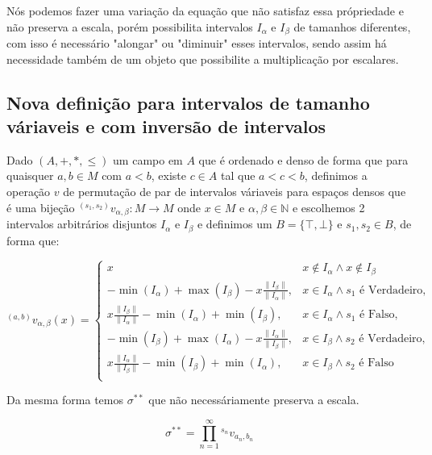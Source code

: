 \documentclass[12pt,a4paper]{article}
\begin{document}
Nós podemos fazer uma variação da equação que não satisfaz essa própriedade e não preserva a escala, porém possibilita
 intervalos $I_{\alpha}$ e $I_{\beta}$ de tamanhos diferentes, com isso é necessário "alongar" ou "diminuir" esses intervalos, 
 sendo assim há necessidade também de um objeto que possibilite a multiplicação por escalares.

 \subsection{Nova definição para intervalos de tamanho váriaveis e com inversão de intervalos}

 Dado $(A, +, *, \leq)$ um campo em $A$ que é ordenado e denso de forma que para quaisquer
  $a,b \in M$ com $a<b$, existe $c \in A$ tal que $a < c < b$, definimos a operação
   $v$ de permutação de par de intervalos váriaveis para espaços densos que é uma 
   bijeção ${}^{(s_1,s_2)}v_{\alpha,\beta}: M \to M$ onde 
   $x \in M$ e $\alpha,\beta \in \mathbb{N}$ e escolhemos 2 intervalos arbitrários 
   disjuntos $I_{\alpha}$ e $I_{\beta}$ e definimos um $B=\{\top, \bot\}$ e 
   $s_1,s_2 \in B$, de forma que:

 \begin{equation}
   {}^{(a,b)}v_{\alpha,\beta}{(x)} = \begin{cases} 
      x & x \not\in I_{\alpha} \land x \not \in I_{\beta}\\
      - \min(I_{\alpha}) + \max(I_{\beta}) - x\frac{\|I_{\beta}\|}{\|I_{\alpha}\|}, & x \in I_{\alpha} \land s_1 \text{ é Verdadeiro},\\
      x\frac{\|I_{\beta}\|}{\|I_{\alpha}\|} - \min(I_{\alpha}) + \min(I_{\beta}), & x \in I_{\alpha} \land s_1 \text{ é Falso},\\
      - \min(I_{\beta}) + \max(I_{\alpha}) - x\frac{\|I_{\alpha}\|}{\|I_{\beta}\|}, & x \in I_{\beta} \land s_2 \text{ é Verdadeiro},\\
      x\frac{\|I_{\alpha}\|}{\|I_{\beta}\|} - \min(I_{\beta}) + \min(I_{\alpha}), & x \in I_{\beta} \land s_2 \text{ é Falso}\\
  \end{cases}
\end{equation}

Da mesma forma temos $\sigma^{**}$ que não necessáriamente preserva a escala.

\begin{equation}
   \sigma^{**} = \prod_{n=1}^{\infty} {}^{s_n}v_{a_n,b_n}
\end{equation}
\end{document}
